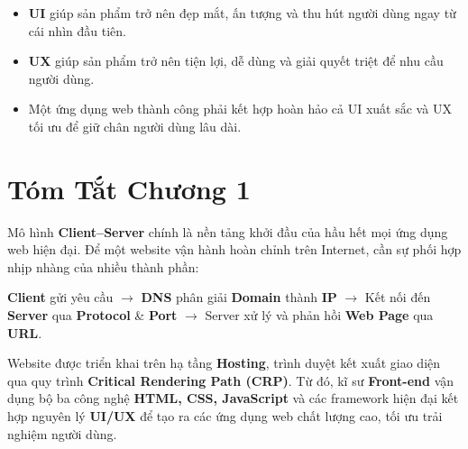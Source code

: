 \begin{warnBox}
\begin{itemize}[leftmargin=1.2em, itemsep=2pt, parsep=0pt]
    \item \textbf{UI} giúp sản phẩm trở nên đẹp mắt, ấn tượng và thu hút người dùng ngay từ cái nhìn đầu tiên.
    \item \textbf{UX} giúp sản phẩm trở nên tiện lợi, dễ dùng và giải quyết triệt để nhu cầu người dùng.
    \item Một ứng dụng web thành công phải kết hợp hoàn hảo cả UI xuất sắc và UX tối ưu để giữ chân người dùng lâu dài.
\end{itemize}
\end{warnBox}

\section{Tóm Tắt Chương 1}

\begin{noteBox}
Mô hình \textbf{Client--Server} chính là nền tảng khởi đầu của hầu hết mọi ứng dụng web hiện đại. Để một website vận hành hoàn chỉnh trên Internet, cần sự phối hợp nhịp nhàng của nhiều thành phần: 
\begin{center}
\textbf{Client} gửi yêu cầu $\rightarrow$ \textbf{DNS} phân giải \textbf{Domain} thành \textbf{IP} $\rightarrow$ Kết nối đến \textbf{Server} qua \textbf{Protocol} \& \textbf{Port} $\rightarrow$ Server xử lý và phản hồi \textbf{Web Page} qua \textbf{URL}.
\end{center}
Website được triển khai trên hạ tầng \textbf{Hosting}, trình duyệt kết xuất giao diện qua quy trình \textbf{Critical Rendering Path (CRP)}. Từ đó, kĩ sư \textbf{Front-end} vận dụng bộ ba công nghệ \textbf{HTML, CSS, JavaScript} và các framework hiện đại kết hợp nguyên lý \textbf{UI/UX} để tạo ra các ứng dụng web chất lượng cao, tối ưu trải nghiệm người dùng.
\end{noteBox}

